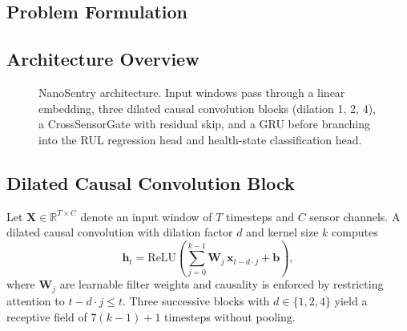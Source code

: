 \documentclass[AMA,Times1COL]{WileyNJDv5}
\begin{document}
\subsection{Problem Formulation}\label{sec:arch:problem}

\subsection{Architecture Overview}\label{sec:arch:overview}

\begin{figure}[!t]
 \centering
 \caption{NanoSentry architecture. Input windows pass through a linear
 embedding, three dilated causal convolution blocks (dilation 1, 2, 4),
 a CrossSensorGate with residual skip, and a GRU before branching into
 the RUL regression head and health-state classification head.}
 \label{fig:arch}
\end{figure}

\subsection{Dilated Causal Convolution Block}\label{sec:arch:dilconv}
Let $\mathbf{X} \in \mathbb{R}^{T \times C}$ denote an input window of
$T$ timesteps and $C$ sensor channels. A dilated causal convolution with
dilation factor $d$ and kernel size $k$ computes
\begin{equation}\label{eq:dilconv}
 \mathbf{h}_t = \text{ReLU}\!\left(
 \sum_{j=0}^{k-1} \mathbf{W}_j \, \mathbf{x}_{t - d \cdot j}
 + \mathbf{b} \right),
\end{equation}
where $\mathbf{W}_j$ are learnable filter weights and causality is enforced
by restricting attention to $t - d\cdot j \leq t$. Three successive blocks
with $d \in \{1,2,4\}$ yield a receptive field of $7(k-1)+1$ timesteps
without pooling.
\end{document}
